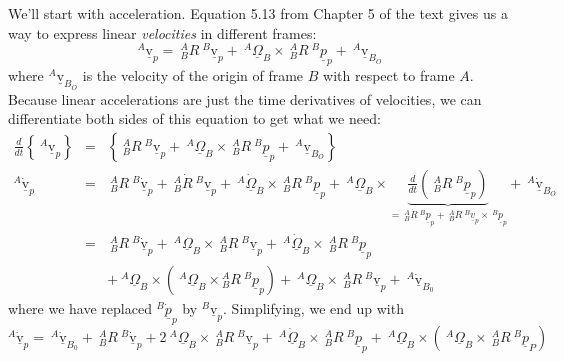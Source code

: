\documentclass[fleqn]{article}
\begin{document}
We'll start with acceleration. Equation 5.13 from Chapter 5 of the text gives us a way to express linear \emph{velocities} in different frames:
\begin{displaymath}
	^{A}\underline{\mathrm{v}}_{p} = \ ^{A}_{B}R\ ^{B}\underline{\mathrm{v}}_{p} + \ ^{A}\underline{\Omega}_{B} \times \ ^{A}_{B}R\ ^{B}\underline{p}_{p} + \ ^{A}\underline{\mathrm{v}}_{B_{O}}
\end{displaymath}
where $^{A}\underline{\mathrm{v}}_{B_{O}}$ is the velocity of the origin of frame $B$ with respect to frame $A$. Because linear accelerations are just the time derivatives of velocities, we can differentiate both sides of this equation to get what we need:
 \begin{eqnarray}
 	\frac{d}{dt}\left\{ \ ^{A}\underline{\mathrm{v}}_{p}  \right\} & = &\left\{ \ ^{A}_{B}R \ ^{B}\underline{\mathrm{v}}_{p} + \ ^{A}\underline{\Omega}_{B} \times \ ^{A}_{B}R\ ^{B}\underline{p}_{p} + \ ^{A}\underline{\mathrm{v}}_{B_{O}} \right\} \nonumber \\
	^{A}\underline{\dot{\mathrm{v}}}_{p} & = & \ ^{A}_{B}R\ ^{B}\underline{\dot{\mathrm{v}}}_{p} + \ ^{A}_{B}\dot{R}\ ^{B}\underline{\mathrm{v}}_{p} + \ ^{A}\underline{\dot{\Omega}}_{B}\times\ ^{A}_{B}R\ ^{B}\underline{p}_{p}+ \ ^{A}\underline{\Omega}_{B}\times \underbrace{\frac{d}{dt}\left(\ ^{A}_{B}R\ ^{B}\underline{p}_{p}\right)}_{=\ ^{A}_{B}\dot{R}\ ^{B}\underline{p}_{p} + \ ^{A}_{B}R\ ^{B}\underline{v}_{p} \times \ ^{B}\dot{\underline{p}}_{p}} + \ ^{A}\underline{\dot{\mathrm{v}}}_{B_{O}} \nonumber \\
	&=& \ ^{A}_{B}R\ ^{B}\underline{\dot{\mathrm{v}}}_{p} + \ ^{A}\underline{\Omega}_{B} \times\ ^{A}_{B}R\ ^{B}\underline{\mathrm{v}}_{p} + \ ^{A}\underline{\dot{\Omega}}_{B}\times\ ^{A}_{B}R\ ^{B}\underline{p}_{p} \nonumber \\ && + \ ^{A}\underline{\Omega}_{B}\times(\ ^{A}\underline{\Omega}_{B}\times\!\! ^{A}_{B}R\ ^{B}\underline{p}_{p})  + \ ^{A}\underline{\Omega}_{B}\times\ ^{A}_{B}R\ ^{B}\underline{\mathrm{v}}_{p} + \ ^{A}\underline{\dot{\mathrm{v}}}_{B_{0}} \nonumber
\end{eqnarray}
where we have replaced $^{B}\underline{\dot{p}}_{p}$ by $^{B}\underline{\mathrm{v}}_{p}$. Simplifying, we end up with
\begin{displaymath}
	^{A}\underline{\dot{\mathrm{v}}}_{p} = \ ^{A}\underline{\dot{\mathrm{v}}}_{B_{0}} + \ ^{A}_{B}R\ ^{B}\underline{\dot{\mathrm{v}}}_{p} + 2\ ^{A}\underline{\Omega}_{B}\times\ ^{A}_{B}R\ ^{B}\underline{\mathrm{v}}_{p} + \ ^{A}\underline{\dot{\Omega}}_{B}\times\ ^{A}_{B}R\ ^{B}\underline{p}_{p} + \ ^{A}\underline{\Omega}_{B}\times\left(\ ^{A}\underline{\Omega}_{B}\times\ ^{A}_{B}R\ ^{B}\underline{p}_{P}\right)
\end{displaymath}
\end{document}
